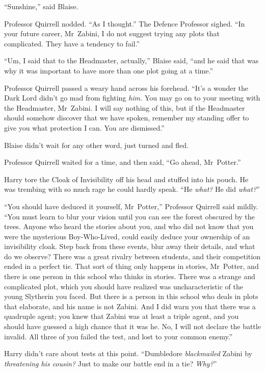 “Sunshine,” said Blaise.

Professor Quirrell nodded. “As I thought.” The Defence Professor sighed. “In your future career, Mr~Zabini, I do not suggest trying any plots that complicated. They have a tendency to fail.”

“Um, I said that to the Headmaster, actually,” Blaise said, “and he said that was why it was important to have more than one plot going at a time.”

Professor Quirrell passed a weary hand across his forehead. “It’s a wonder the Dark Lord didn’t go mad from fighting \emph{him.} You may go on to your meeting with the Headmaster, Mr~Zabini. I will say nothing of this, but if the Headmaster should somehow discover that we have spoken, remember my standing offer to give you what protection I can. You are dismissed.”

Blaise didn’t wait for any other word, just turned and fled.

\later

Professor Quirrell waited for a time, and then said, “Go ahead, Mr~Potter.”

Harry tore the Cloak of Invisibility off his head and stuffed into his pouch. He was trembing with so much rage he could hardly speak. “He \emph{what?} He did \emph{what?}”

“You should have deduced it yourself, Mr~Potter,” Professor Quirrell said mildly. “You must learn to blur your vision until you can see the forest obscured by the trees. Anyone who heard the stories about you, and who did not know that you were the mysterious Boy-Who-Lived, could easily deduce your ownership of an invisibility cloak. Step back from these events, blur away their details, and what do we observe? There was a great rivalry between students, and their competition ended in a perfect tie. That sort of thing only happens in stories, Mr~Potter, and there is one person in this school who thinks in stories. There was a strange and complicated plot, which you should have realized was uncharacteristic of the young Slytherin you faced. But there is a person in this school who deals in plots that elaborate, and his name is not Zabini. And I did warn you that there was a quadruple agent; you knew that Zabini was at least a triple agent, and you should have guessed a high chance that it was he. No, I will not declare the battle invalid. All three of you failed the test, and lost to your common enemy.”

Harry didn’t care about tests at this point. “Dumbledore \emph{blackmailed} Zabini by \emph{threatening his cousin?} Just to make our battle end in a tie? \emph{Why?}”

